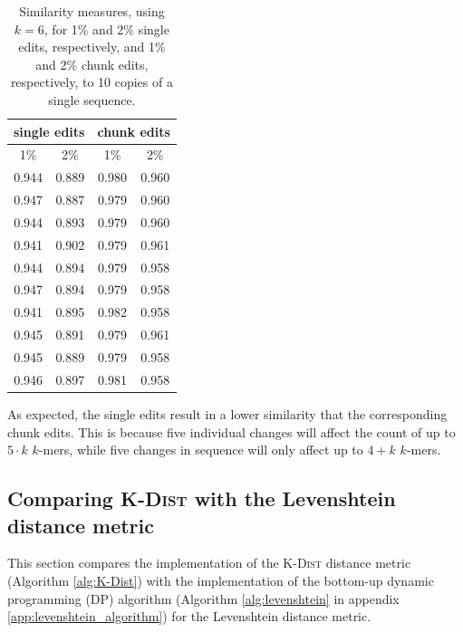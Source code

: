 \begin{table}[H]
  \centering
  \begin{tabular}{c|c||c|c}
    \multicolumn{2}{c||}{single edits}  & \multicolumn{2}{c}{chunk edits} \\
    \hline\hline
    1\%   &   2\%                   &   1\%   &   2\% \\
    \hline
    0.944   & 0.889                     & 0.980     & 0.960 \\
    0.947   & 0.887                     & 0.979     & 0.960 \\
    0.944   & 0.893                     & 0.979     & 0.960 \\
    0.941   & 0.902                     & 0.979     & 0.961 \\
    0.944   & 0.894                     & 0.979     & 0.958 \\
    0.947   & 0.894                     & 0.979     & 0.958 \\
    0.941   & 0.895                     & 0.982     & 0.958 \\
    0.945   & 0.891                     & 0.979     & 0.961 \\
    0.945   & 0.889                     & 0.979     & 0.958 \\
    0.946   & 0.897                     & 0.981     & 0.958
  \end{tabular}
  \caption{Similarity measures, using $k=6$, for 1\% and 2\% single edits,
    respectively, and 1\% and 2\% chunk edits, respectively, to 10 copies of a
    single sequence.}
  \label{tab:altered_seqs_similarities}
\end{table}

As expected, the single edits result in a lower similarity that the
corresponding chunk edits. This is because five individual changes will affect
the count of up to $5 \cdot k$ $k$-mers, while five changes in sequence will
only affect up to $4+k$ $k$-mers.


\subsection{Comparing \textsc{K-Dist} with the Levenshtein distance metric}
\label{sec:kdist_vs_levenshtein}

This section compares the implementation of the \textsc{K-Dist} distance metric
(Algorithm \ref{alg:K-Dist}) with the implementation of the bottom-up dynamic
programming (DP) algorithm (Algorithm \ref{alg:levenshtein} in appendix
\ref{app:levenshtein_algorithm}) for the Levenshtein distance metric.

